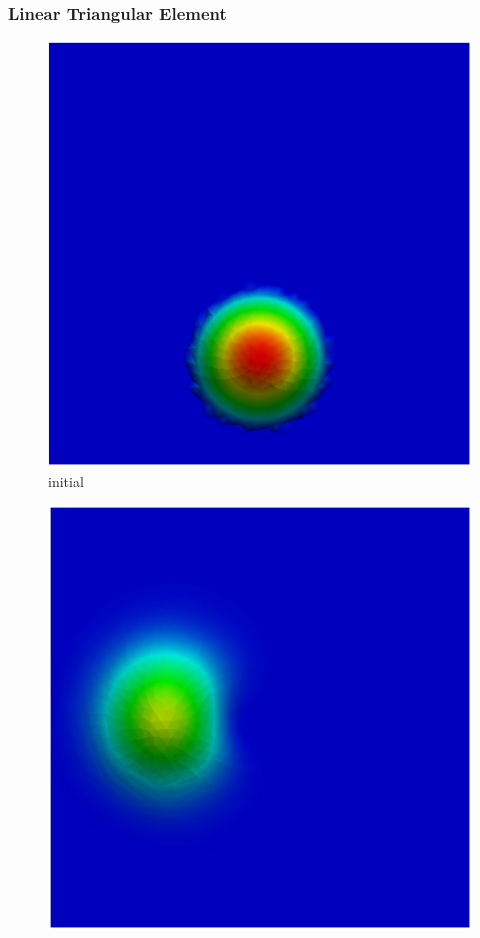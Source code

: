 
\begin{frame} 
 \frametitle{\normalsize Linear Triangular Element}
\vspace{-1.0cm}
\begin{center}
\begin{figure}[H]
     \centering
     \begin{minipage}{.5\linewidth}
      \centering
      \includegraphics[scale=0.22]{./images/figSLlinear0.png}\\
      \tiny initial 
     \end{minipage}%
     \begin{minipage}{.5\linewidth}
      \centering
      \includegraphics[scale=0.22]{./images/figSLlinear1.png}\\

\end{minipage}
\end{figure}
\end{center}
\end{frame}
